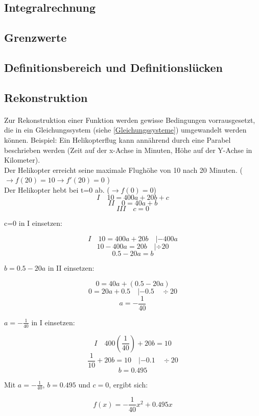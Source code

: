 \documentclass{article}
\begin{document}
\subsection{Integralrechnung}\label{Integralrechnung}

\subsection{Grenzwerte}
\subsection{Definitionsbereich und Definitionslücken}\label{Definitionsbereich}
\subsection{Rekonstruktion}\label{Rekonstruktion}
\paragraph{}
Zur Rekonstruktion einer Funktion werden gewisse Bedingungen vorrausgesetzt, die in ein Gleichungssystem (siehe \ref{Gleichungssysteme}) umgewandelt werden können.
Beispiel: Ein Helikopterflug kann annährend durch eine Parabel beschrieben werden (Zeit auf der x-Achse in Minuten, Höhe auf der Y-Achse in Kilometer). \\
Der Helikopter erreicht seine maximale Flughöhe von 10 nach 20 Minuten. ( $ \rightarrow f(20)=10 \rightarrow f'(20)=0 $ ) \\
Der Helikopter hebt bei t=0 ab. ($ \rightarrow f(0)=0$) \\

\[ I \quad 10=400a+20b+c \]
\[ II \quad 0=40a+b \]
\[ III \quad c=0 \]

c=0 in I einsetzen:

\[I \quad 10=400a+20b \quad |-400a \]
\[ 10-400a=20b \quad | \div 20\]
\[ 0.5-20a=b\]

$b= 0.5-20a $ in II einsetzen:

\[ 0=40a+(0.5-20a)\]
\[ 0=20a+0.5 \quad |-0.5 \quad \div 20\]
\[ a=-\frac{1}{40} \]

$a=-\frac{1}{40}$ in I einsetzen:

\[ I \quad 400(\frac{1}{40})+20b=10 \]
\[ \frac{1}{10}+20b=10 \quad |-0.1 \quad \div 20\]
\[ b=0.495\]

Mit $a=-\frac{1}{40}$, $b=0.495$ und $c=0$, ergibt sich:

\[f(x)=-\frac{1}{40}x^2+0.495x\]
\end{document}
